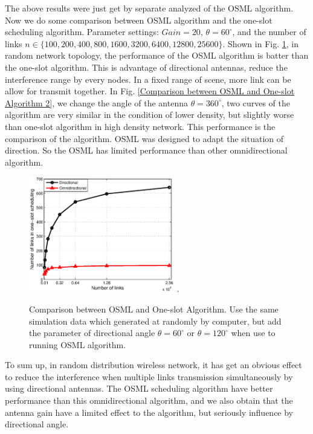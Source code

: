 \documentclass[conference]{IEEEtran}
\begin{document}
The above results were just get by separate analyzed of the OSML algorithm. Now we do some comparison between OSML algorithm and the one-slot scheduling algorithm. Parameter settings: $Gain=20$, $\theta =60^{\circ}$, and the number of links $n \in \{100,200,400,800,1600,3200,6400,12800,25600\}$. Shown in Fig. \ref{Comparison between OSML and One-slot Algorithm 1}, in random network topology, the performance of the OSML algorithm is batter than the one-slot algorithm. This is advantage of directional antennas, reduce the interference range by every nodes. In a fixed range of scene, more link can be allow for transmit together. In Fig. \ref{Comparison between OSML and One-slot Algorithm 2}, we change the angle of the antenna $\theta=360^{\circ}$, two curves of the algorithm are very similar in the condition of lower density, but slightly worse than one-slot algorithm in high density network. This performance is the comparison of the algorithm. OSML was designed to adapt the situation of direction. So the OSML has limited performance than other omnidirectional algorithm.

\begin{figure}[!t]
\centering
\includegraphics[width=2.5in]{image/5.eps}
\DeclareGraphicsExtensions.
\caption{Comparison between OSML and One-slot Algorithm. Use the same simulation data which generated at randomly by computer, but add the parameter of directional angle $\theta=60^{\circ}$ or $\theta=120^{\circ}$ when use to running OSML algorithm.}
\label{Comparison between OSML and One-slot Algorithm 1}
\end{figure}


To sum up, in random distribution wireless network, it has get an obvious effect to reduce the interference when multiple links transmission simultaneously by using directional antennas. The OSML scheduling algorithm have better performance than this omnidirectional algorithm, and we also obtain that the antenna gain have a limited effect to the algorithm, but seriously influence by directional angle.
\end{document}
